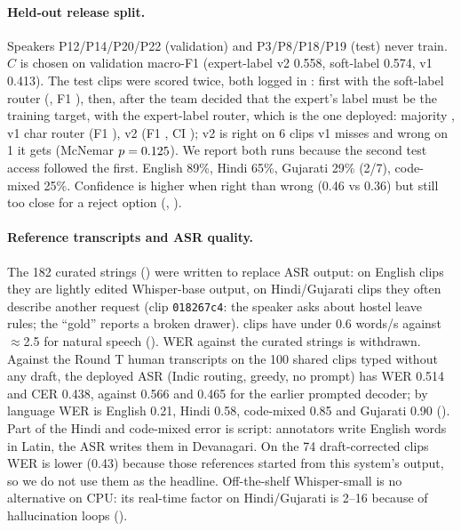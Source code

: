 \documentclass[sigconf,authordraft]{acmart}
\begin{document}
\paragraph{Held-out release split.}
Speakers P12/P14/P20/P22 (validation) and P3/P8/P18/P19 (test) never train. $C$ is chosen on validation macro-F1 (expert-label v2 0.558, soft-label 0.574, v1 0.413). The test clips were scored twice, both logged in : first with the soft-label router (\RelSoft{}, F1 \RelSoftFone{}), then, after the team decided that the expert's label must be the training target, with the expert-label router, which is the one deployed: majority \RelMaj{}, v1 char router \RelVone{} (F1 \RelVoneFone{}), v2 \RelVtwo{} (F1 \RelVtwoFone{}, CI \RelVtwoCI{}); v2 is right on 6 clips v1 misses and wrong on 1 it gets (McNemar $p=0.125{}$). We report both runs because the second test access followed the first. English 89\%, Hindi 65\%, Gujarati 29\% (2/7), code-mixed 25\%. Confidence is higher when right than wrong (0.46 vs 0.36) but still too close for a reject option (, ).
\paragraph{Reference transcripts and ASR quality.}
The 182 curated strings () were written to replace ASR output: on English clips they are lightly edited Whisper-base output, on Hindi/Gujarati clips they often describe another request (clip \texttt{018267c4}: the speaker asks about hostel leave rules; the ``gold'' reports a broken drawer). \RefLow{} clips have under 0.6 words/s against $\approx$2.5 for natural speech (). WER against the curated strings is withdrawn. Against the Round T human transcripts on the 100 shared clips typed without any draft, the deployed ASR (Indic routing, greedy, no prompt) has WER 0.514 and CER 0.438, against 0.566 and 0.465 for the earlier prompted decoder; by language WER is English 0.21, Hindi 0.58, code-mixed 0.85 and Gujarati 0.90 (). Part of the Hindi and code-mixed error is script: annotators write English words in Latin, the ASR writes them in Devanagari. On the 74 draft-corrected clips WER is lower (0.43) because those references started from this system's output, so we do not use them as the headline. Off-the-shelf Whisper-small is no alternative on CPU: its real-time factor on Hindi/Gujarati is 2--16 because of hallucination loops ().
\end{document}
